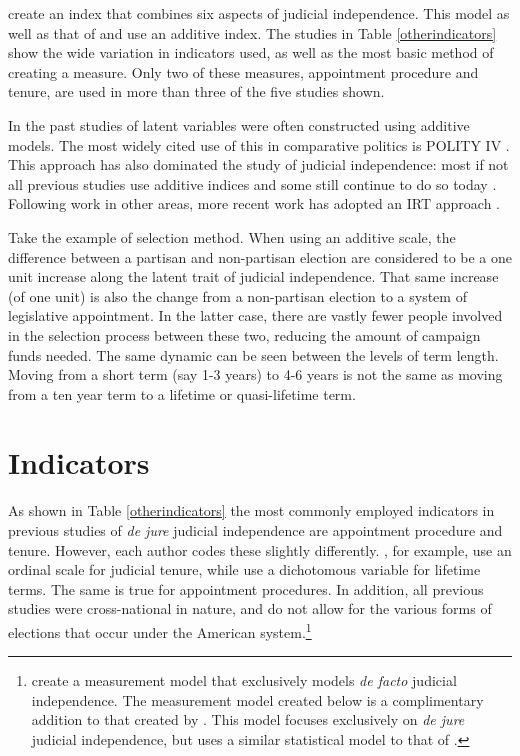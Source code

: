 \documentclass[12pt]{article}
\begin{document}
\doublespacing\normalsize
\citet*{Melton2014} create an index that combines six aspects of judicial independence.  This model as well as that of \citet*{Feld2003} and \citet*{Keith2002b} use an additive index.  The studies in Table \ref{otherindicators} show the wide variation in indicators used, as well as the most basic method of creating a measure.  Only two of these measures, appointment procedure and tenure, are used in more than three of the five studies shown.

In the past studies of latent variables were often constructed using additive models.  The most widely cited use of this in comparative politics is POLITY IV \citep{Polity}.  This approach has also dominated the study of judicial independence: most if not all previous studies use additive indices \citep{Feld2003,Keith2002a,Laporta2004} and some still continue to do so today \citep{Melton2014}.  Following work in other areas, more recent work has adopted an IRT approach \citep{Martin2002,Treier2008,Schnakenberg2014,Linzer2014,Fariss2014}.

Take the example of selection method.  When using an additive scale, the difference between a partisan and non-partisan election are considered to be a one unit increase along the latent trait of judicial independence.  That same increase (of one unit) is also the change from a non-partisan election to a system of legislative appointment.  In the latter case, there are vastly fewer people involved in the selection process between these two, reducing the amount of campaign funds needed.  The same dynamic can be seen between the levels of term length.  Moving from a short term (say 1-3 years) to 4-6 years is not the same as moving from a ten year term to a lifetime or quasi-lifetime term.

\section{Indicators}\label{Indicators}
As shown in Table \ref{otherindicators} the most commonly employed indicators in previous studies of \textit{de jure} judicial independence are appointment procedure and tenure.  However, each author codes these slightly differently.  \citet{Feld2003}, for example,  use an ordinal scale for judicial tenure, while \citet{Melton2014} use a dichotomous variable for lifetime terms.  The same is true for appointment procedures.  In addition, all previous studies were cross-national in nature, and do not allow for the various forms of elections that occur under the American system.\footnote{\citet*{Linzer2014} create a measurement model that exclusively models \textit{de facto} judicial independence.  The measurement model created below is a complimentary addition to that created by \citeauthor{Linzer2014}.  This model focuses exclusively on \textit{de jure} judicial independence, but uses a similar statistical model to that of \citeauthor{Linzer2014}.}    
\end{document}
